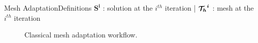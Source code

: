 \begin{frame}[noframenumbering]{Mesh Adaptation}{Definitions}
  $\boldsymbol{S^i}$ : solution at the $i^{th}$ iteration |
  $\boldsymbol{{\mathcal{T}_h}^i}$ : mesh at the $i^{th}$ iteration
  \vspace{0.5cm}
   \begin{figure}
        \caption*{Classical mesh adaptation workflow.}
   \end{figure}
\end{frame}


